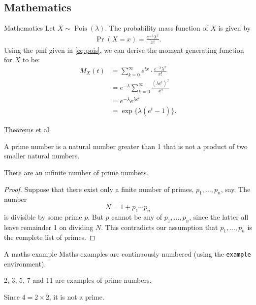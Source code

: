 \documentclass[,aspectratio=43]{beamer}
\begin{document}
\hypertarget{mathematics}{%
\subsection{Mathematics}\label{mathematics}}

\begin{frame}{Mathematics}
\protect\hypertarget{mathematics-1}{}
Let \(X\sim\operatorname{Pois}(\lambda)\). The probability mass function
of \(X\) is given by \begin{align}\label{eq:pois}
    \Pr(X=x) = \frac{e^{-\lambda}\lambda^x}{x!}.
\end{align} Using the pmf given in \eqref{eq:pois}, we can derive the
moment generating function for \(X\) to be: \begin{align*}
    M_X(t) 
    &= \sum_{k=0}^\infty e^{tx} \cdot \frac{e^{-\lambda}\lambda^x}{x!} \\
    &= e^{-\lambda} \sum_{k=0}^\infty  \frac{(\lambda e^t)^x}{x!} \\
    &= e^{-\lambda}  e^{\lambda e^t} \\
    &= \exp\{\lambda(e^t - 1) \}.
\end{align*}
\end{frame}

\begin{frame}{Theorems et al.}
\protect\hypertarget{theorems-et-al.}{}
\begin{definition}
A prime number is a natural number greater than 1 that is not a product
of two smaller natural numbers.
\end{definition}

\begin{theorem}
There are an infinite number of prime numbers.
\end{theorem}

\begin{proof}
Suppose that there exist only a finite number of primes,
\(p_1,\dots,p_n\), say. The number \[
N = 1+p_1\cdots p_n
\] is divisible by some prime \(p\). But \(p\) cannot be any of
\(p_1,\dots,p_n\), since the latter all leave remainder 1 on dividing
\(N\). This contradicts our assumption that \(p_1,\dots,p_n\) is the
complete list of primes.
\end{proof}
\end{frame}

\begin{frame}{A maths example}
\protect\hypertarget{a-maths-example}{}
Maths examples are continuously numbered (using the \texttt{example}
environment).

\begin{example}
2, 3, 5, 7 and 11 are examples of prime numbers.
\end{example}

\begin{example}
Since \(4 = 2 \times 2\), it is not a prime.
\end{example}
\end{frame}
\end{document}
